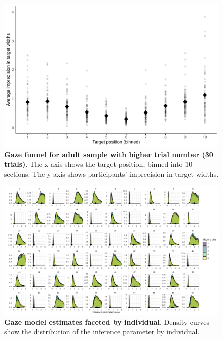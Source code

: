 \documentclass[
  man,mask,floatsintext]{apa7}
\begin{document}
\newpage



\begin{figure}[H]
\includegraphics[width=1\linewidth]{../figures/gazefunnel_adults} \caption{\textbf{Gaze funnel for adult sample with higher trial number (30 trials)}. The x-axis shows the target position, binned into 10 sections. The y-axis shows participants' imprecision in target widths.}\label{fig:S2}
\end{figure}

\newpage



\begin{figure}[H]
\includegraphics[width=1\linewidth]{../figures/supplements_gazemodel_facetedinference} \caption{\textbf{Gaze model estimates faceted by individual}. Density curves show the distribution of the inference parameter by individual.}\label{fig:S3}
\end{figure}
\end{document}
